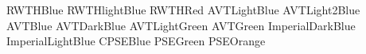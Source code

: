 
%	

\colorbox{RWTHBlue}{RWTHBlue}
\colorbox{RWTHlightBlue}{RWTHlightBlue}
\colorbox{RWTHRed}{RWTHRed}
\colorbox{AVTLightBlue}{AVTLightBlue}
\colorbox{AVTLight2Blue}{AVTLight2Blue}
\colorbox{AVTBlue}{AVTBlue}
\colorbox{AVTDarkBlue}{AVTDarkBlue}
\colorbox{AVTLightGreen}{AVTLightGreen}
\colorbox{AVTGreen}{AVTGreen}
\colorbox{ImperialDarkBlue}{ImperialDarkBlue}
\colorbox{ImperialLightBlue}{ImperialLightBlue}
\colorbox{CPSEBlue}{CPSEBlue}
\colorbox{PSEGreen}{PSEGreen}
\colorbox{PSEOrange}{PSEOrange}
